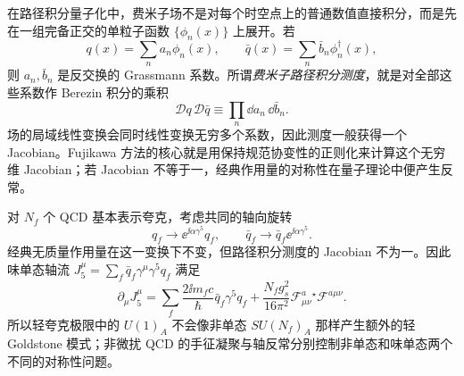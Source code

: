 \begin{definition}
在路径积分量子化中，费米子场不是对每个时空点上的普通数值直接积分，而是先在一组完备正交的单粒子函数 $\{\phi_n(x)\}$ 上展开。若
\begin{equation*}
 q(x)=\sum_n a_n\phi_n(x),
 \qquad
 \bar q(x)=\sum_n\bar b_n\phi_n^\dagger(x),
\end{equation*}
则 $a_n,\bar b_n$ 是反交换的 Grassmann 系数。所谓\emph{费米子路径积分测度}，就是对全部这些系数作 Berezin 积分的乘积
\begin{equation*}
 \mathcal Dq\,\mathcal D\bar q
 \equiv\prod_n\dd a_n\,\dd\bar b_n.
\end{equation*}
场的局域线性变换会同时线性变换无穷多个系数，因此测度一般获得一个 Jacobian。Fujikawa 方法的核心就是用保持规范协变性的正则化来计算这个无穷维 Jacobian；若 Jacobian 不等于一，经典作用量的对称性在量子理论中便产生反常。
\end{definition}

\begin{proposition}
对 $N_f$ 个 QCD 基本表示夸克，考虑共同的轴向旋转
\begin{equation}
\boxed{
 q_f\to \ee^{\ii\alpha\gamma^5}q_f,
 \qquad
 \bar q_f\to \bar q_f\ee^{\ii\alpha\gamma^5}.}
\label{eq:qcd-singlet-axial-rotation-dp68}
\end{equation}
经典无质量作用量在这一变换下不变，但路径积分测度的 Jacobian 不为一。因此味单态轴流 $J_5^\mu=\sum_f\bar q_f\gamma^\mu\gamma^5q_f$ 满足
\begin{equation}
 \boxed{
 \partial_\mu J_5^\mu
 =\sum_f\frac{2\ii m_fc}{\hbar}\bar q_f\gamma^5q_f
 +\frac{N_f g_s^2}{16\pi^2}
 \mathcal F_{\mu\nu}^a{}^\star\!\mathcal F^{a\mu\nu}.}
 \label{eq:qcd-singlet-axial-anomaly-dp32}
\end{equation}
所以轻夸克极限中的 $U(1)_A$ 不会像非单态 $SU(N_f)_A$ 那样产生额外的轻 Goldstone 模式；非微扰 QCD 的手征凝聚与轴反常分别控制非单态和味单态两个不同的对称性问题。
\end{proposition}

